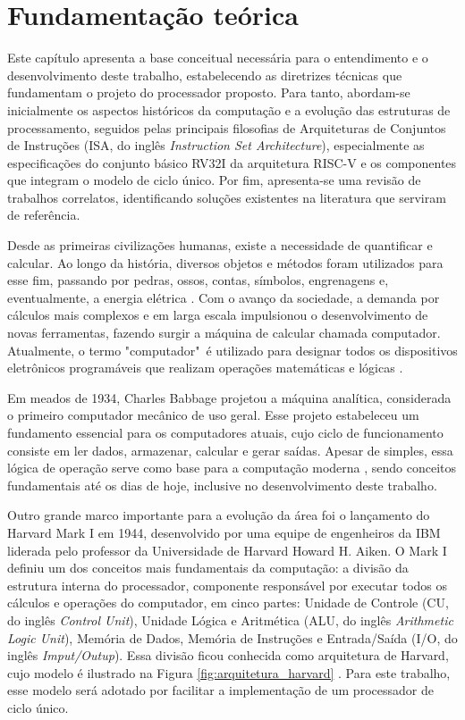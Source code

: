 \chapter{Fundamentação teórica}\label{cap:fundamentacao_teorica}

Este capítulo apresenta a base conceitual necessária para o entendimento e o desenvolvimento deste trabalho, estabelecendo as diretrizes técnicas que fundamentam o projeto do processador proposto. Para tanto, abordam-se inicialmente os aspectos históricos da computação e a evolução das estruturas de processamento, seguidos pelas principais filosofias de Arquiteturas de Conjuntos de Instruções (ISA, do inglês \textit{Instruction Set Architecture}), especialmente as especificações do conjunto básico RV32I da arquitetura RISC-V e os componentes que integram o modelo de ciclo único. Por fim, apresenta-se uma revisão de trabalhos correlatos, identificando soluções existentes na literatura que serviram de referência.

Desde as primeiras civilizações humanas, existe a necessidade de quantificar e calcular. Ao longo da história, diversos objetos e métodos foram utilizados para esse fim, passando por pedras, ossos, contas, símbolos, engrenagens e, eventualmente, a energia elétrica \cite{silva2024arquitetura}. Com o avanço da sociedade, a demanda por cálculos mais complexos e em larga escala impulsionou o desenvolvimento de novas ferramentas, fazendo surgir a máquina de calcular chamada computador. Atualmente, o termo "computador"\ é utilizado para designar todos os dispositivos eletrônicos programáveis que realizam operações matemáticas e lógicas \cite{harper_computer}.

Em meados de 1934, Charles Babbage projetou a máquina analítica, considerada o primeiro computador mecânico de uso geral. Esse projeto estabeleceu um fundamento essencial para os computadores atuais, cujo ciclo de funcionamento consiste em ler dados, armazenar, calcular e gerar saídas. Apesar de simples, essa lógica de operação serve como base para a computação moderna \cite{silva2024arquitetura}, sendo conceitos fundamentais até os dias de hoje, inclusive no desenvolvimento deste trabalho.

Outro grande marco importante para a evolução da área foi o lançamento do Harvard Mark I em 1944, desenvolvido por uma equipe de engenheiros da IBM liderada pelo professor da Universidade de Harvard Howard H. Aiken. O Mark I definiu um dos conceitos mais fundamentais da computação: a divisão da estrutura interna do processador, componente responsável por executar todos os cálculos e operações do computador, em cinco partes: Unidade de Controle (CU, do inglês \textit{Control Unit}), Unidade Lógica e Aritmética (ALU, do inglês \textit{Arithmetic Logic Unit}), Memória de Dados, Memória de Instruções e Entrada/Saída (I/O, do inglês \textit{Imput/Outup}). Essa divisão ficou conhecida como arquitetura de Harvard, cujo modelo é ilustrado na Figura \ref{fig:arquitetura_harvard} \cite{silva2024arquitetura}. Para este trabalho, esse modelo será adotado por facilitar a implementação de um processador de ciclo único.

